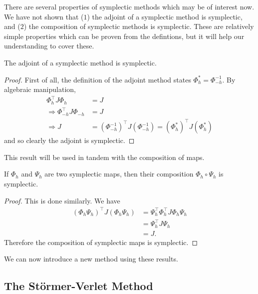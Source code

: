 There are several properties of symplectic methods which may be of interest now.
We have not shown that ($1$) the adjoint of a symplectic method is symplectic, and ($2$) the composition of symplectic methods is symplectic.
These are relatively simple properties which can be proven from the defintions, but it will help our understanding to cover these.
\begin{proposition}
	The adjoint of a symplectic method is symplectic.
\end{proposition}
\begin{proof}
	First of all, the definition of the adjoint method states $\Phi^*_h = \Phi^{-1}_{-h}$.
	By algebraic manipulation,
	\begin{align*}
		\Phi_h^\top J \Phi_h &= J \\
		\Rightarrow \Phi_{-h}^\top J \Phi_{-h} &= J \\
		\Rightarrow J &= (\Phi_{-h}^{-1})^\top J (\Phi_{-h}^{-1}) = (\Phi_h^*)^\top J (\Phi_h^*)
	\end{align*}
	and so clearly the adjoint is symplectic.
\end{proof}
This result will be used in tandem with the composition of maps.
\begin{proposition}
	If $\Phi_h$ and $\Psi_h$ are two symplectic maps, then their composition $\Phi_h \circ \Psi_h$ is symplectic.
\end{proposition}
\begin{proof}
	This is done similarly. We have
	\begin{align*}
		\left(\Phi_h \Psi_h\right)^\top J \left(\Phi_h \Psi_h\right) &= \Psi_h^\top \Phi_h^\top J \Phi_h \Psi_h \\
		&= \Psi_h^\top J \Psi_h \\
		&= J.
	\end{align*}
	Therefore the composition of symplectic maps is symplectic.	
\end{proof}

We can now introduce a new method using these results.

\subsection{The St\"ormer-Verlet Method}

